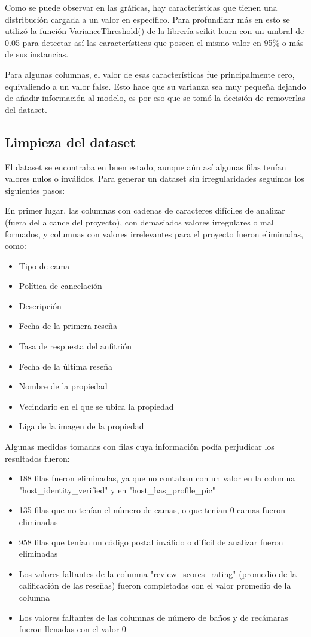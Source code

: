 \documentclass[sigconf,authorversion,nonacm]{acmart}
\begin{document}
Como se puede observar en las gráficas, hay características que tienen una distribución cargada a un valor en específico. Para profundizar más en esto se utilizó la función VarianceThreshold() de la librería scikit-learn con un umbral de 0.05 para detectar así las características que poseen el mismo valor en 95\% o más de sus instancias.

Para algunas columnas, el valor de esas características fue principalmente cero, equivaliendo a un valor false. Esto hace que su varianza sea muy pequeña dejando de añadir información al modelo, es por eso que se tomó la decisión de removerlas del dataset.


\subsection{Limpieza del dataset}
El dataset se encontraba en buen estado, aunque aún así algunas filas tenían valores nulos o inválidos. Para generar un dataset sin irregularidades seguimos los siguientes pasos:

En primer lugar, las columnas con cadenas de caracteres difíciles de analizar (fuera del alcance del proyecto), con demasiados valores irregulares o mal formados, y columnas con valores irrelevantes para el proyecto fueron eliminadas, como:
\begin{itemize}
  \item Tipo de cama
  \item Política de cancelación
  \item Descripción
  \item Fecha de la primera reseña
  \item Tasa de respuesta del anfitrión
  \item Fecha de la última reseña
  \item Nombre de la propiedad
  \item Vecindario en el que se ubica la propiedad
  \item Liga de la imagen de la propiedad
\end{itemize}

Algunas medidas tomadas con filas cuya información podía perjudicar los resultados fueron:
\begin{itemize}
  \item 188 filas fueron eliminadas, ya que no contaban con un valor en la columna "host\_identity\_verified" y en "host\_has\_profile\_pic"
  \item 135 filas que no tenían el número de camas, o que tenían 0 camas fueron eliminadas
  \item 958 filas que tenían un código postal inválido o difícil de analizar fueron eliminadas
  \item Los valores faltantes de la columna "review\_scores\_rating" (promedio de la calificación de las reseñas) fueron completadas con el valor promedio de la columna
  \item Los valores faltantes de las columnas de número de baños y de recámaras fueron llenadas con el valor 0
\end{itemize}
\end{document}
